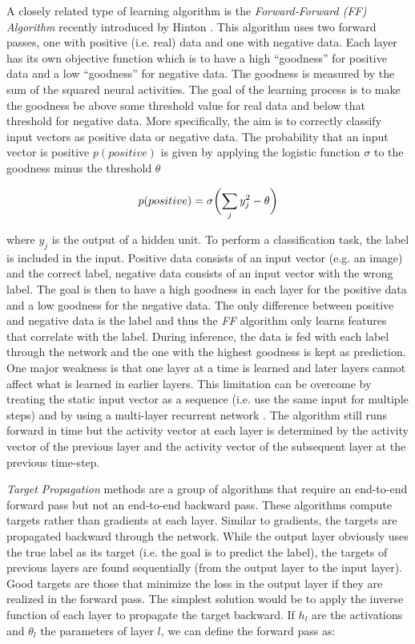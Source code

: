 A closely related type of learning algorithm is the \emph{Forward-Forward (FF) Algorithm} recently introduced by Hinton .
This algorithm uses two forward passes, one with positive (i.e. real) data and one with negative data.
Each layer has its own objective function which is to have a high ``goodness'' for positive data and a low ``goodness'' for negative data. 
The goodness is measured by the sum of the squared neural activities.
The goal of the learning process is to make the goodness be above some threshold value for real data and below that threshold for negative data.
More specifically, the aim is to correctly classify input vectors as positive data or negative data.
The probability that an input vector is positive $p(positive)$ is given by applying the logistic function $\sigma$ to the goodness minus the threshold $\theta$

\begin{equation}\eqlbl{ff2}
	p(positive) = \sigma \biggl( \sum_j y^2_j - \theta \biggr)
\end{equation}

where $y_j$ is the output of a hidden unit.
To perform a classification task, the label is included in the input.
Positive data consists of an input vector (e.g. an image) and the correct label, negative data consists of an input vector with the wrong label.
The goal is then to have a high goodness in each layer for the positive data and a low goodness for the negative data.
The only difference between positive and negative data is the label and thus the \emph{FF} algorithm only learns features that correlate with the label.
During inference, the data is fed with each label through the network and the one with the highest goodness is kept as prediction.
One major weakness is that one layer at a time is learned and later layers cannot affect what is learned in earlier layers.
This limitation can be overcome by treating the static input vector as a sequence (i.e. use the same input for multiple steps) and by using a multi-layer recurrent network .
The algorithm still runs forward in time but the activity vector at each layer is determined by the activity vector of the previous layer and the activity vector of the subsequent layer at the previous time-step.

\emph{Target Propagation} methods are a group of algorithms that require an end-to-end forward pass but not an end-to-end backward pass.
These algorithms compute targets rather than gradients at each layer.
Similar to gradients, the targets are propagated backward through the network.
While the output layer obviously uses the true label as its target (i.e. the goal is to predict the label), the targets of previous layers are found sequentially (from the output layer to the input layer).
Good targets are those that minimize the loss in the output layer if they are realized in the forward pass.
The simplest solution would be to apply the inverse function of each layer to propagate the target backward.
If $h_l$ are the activations and $\theta_l$ the parameters of layer $l$, we can define the forward pass as:

